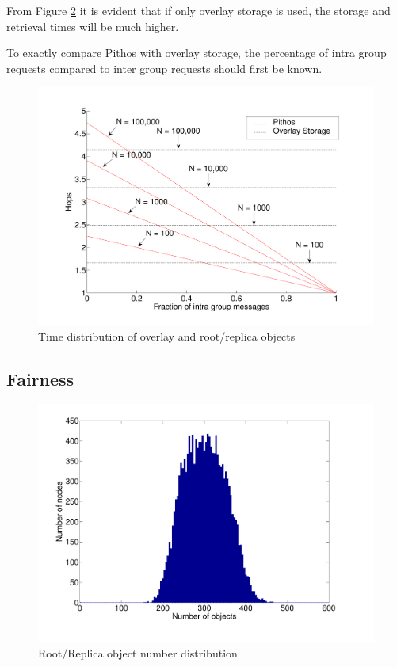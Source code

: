 \documentclass[10pt,a4paper,conference]{IEEEtran}
\begin{document}
From Figure \ref{fig_pithos_response} it is evident that if only overlay storage is used, the storage and retrieval times will be much higher.

To exactly compare Pithos with overlay storage, the percentage of intra group requests compared to inter group requests should first be known.

\begin{figure}[htbp]
 \centering
 \includegraphics[clip=true, viewport=2cm 1cm 27cm 19.5cm, width=\columnwidth]{Hops_vsGroupFrac_4n}
 \caption{Time distribution of overlay and root/replica objects}
 \label{fig_pithos_response}
\end{figure}


\subsection{Fairness}

\begin{figure}[htbp]
 \centering
 \includegraphics[clip=true, viewport=1.5cm 1.8cm 26.5cm 20cm, width=\columnwidth]{RootRepObjects}
 \caption{Root/Replica object number distribution}
 \label{fig_pithos_response}
\end{figure}
\end{document}
